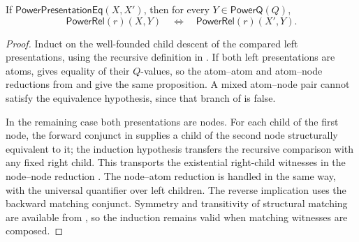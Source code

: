 \begin{lemma}
If $\mathsf{PowerPresentationEq}(X,X')$, then for every
$Y\in\mathsf{PowerQ}(Q)$,
\[
\mathsf{PowerRel}(r)(X,Y)\quad\Longleftrightarrow\quad
\mathsf{PowerRel}(r)(X',Y).
\]
\end{lemma}
\begin{proof}
Induct on the well-founded child descent of the compared left
presentations, using the recursive definition in .  If
both left presentations are atoms,  gives
equality of their $Q$-values, so the atom--atom and atom--node reductions
from  and  give the same
proposition.  A mixed atom--node pair cannot satisfy the equivalence
hypothesis, since that branch of  is false.

In the remaining case both presentations are nodes.  For each child of the
first node, the forward conjunct in  supplies a
child of the second node structurally equivalent to it; the induction
hypothesis transfers the recursive comparison with any fixed right child.
This transports the existential right-child witnesses in the node--node
reduction .  The node--atom reduction
 is handled in the same way, with the universal
quantifier over left children.  The reverse implication uses the backward
matching conjunct.  Symmetry and transitivity of structural matching are
available from , so the induction
remains valid when matching witnesses are composed.
\end{proof}
